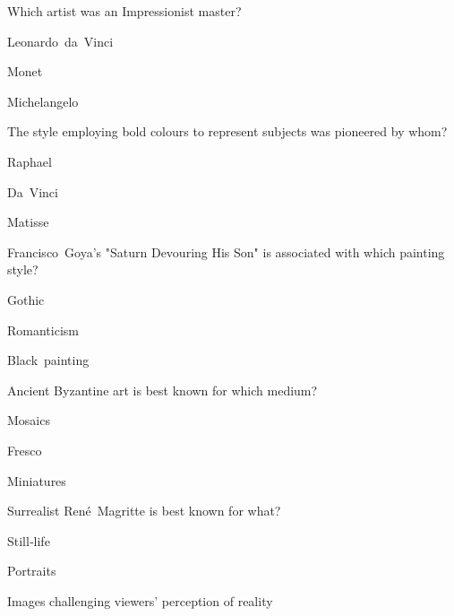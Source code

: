 \begin{enhancedmcq}{Which artist was an Impressionist master?}
\item Leonardo da Vinci
\item Monet
\item Michelangelo

\end{enhancedmcq}
\begin{enhancedmcq}{The style employing bold colours to represent subjects was pioneered by whom?}
\item Raphael
\item Da Vinci
\item Matisse

\end{enhancedmcq}
\begin{enhancedmcq}{Francisco Goya's "Saturn Devouring His Son" is associated with which painting style?}
\item Gothic
\item Romanticism
\item Black painting

\end{enhancedmcq}
\begin{enhancedmcq}{Ancient Byzantine art is best known for which medium?}
\item Mosaics
\item Fresco
\item Miniatures

\end{enhancedmcq}
\begin{enhancedmcq}{Surrealist René Magritte is best known for what?}
\item Still‑life
\item Portraits
\item Images challenging viewers' perception of reality
\end{enhancedmcq}